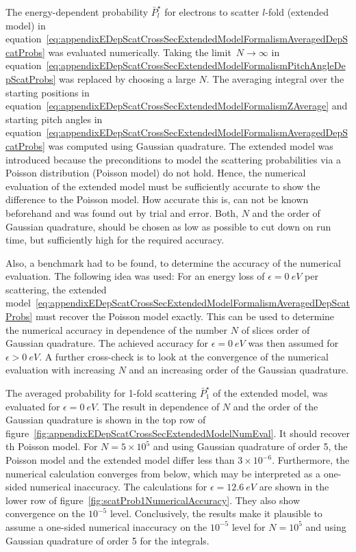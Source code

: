 The energy-dependent probability $\bar{P}^{\star}_l$ for electrons to scatter $l$-fold (extended model) in equation~\eqref{eq:appendixEDepScatCrossSecExtendedModelFormalismAveragedDepScatProbs} was evaluated numerically. Taking the limit~$N\rightarrow\infty$ in equation~\eqref{eq:appendixEDepScatCrossSecExtendedModelFormalismPitchAngleDepScatProbs} was replaced by choosing a large $N$. The averaging integral over the starting positions in equation~\eqref{eq:appendixEDepScatCrossSecExtendedModelFormalismZAverage} and starting pitch angles in equation~\eqref{eq:appendixEDepScatCrossSecExtendedModelFormalismAveragedDepScatProbs} was computed using Gaussian quadrature. The extended model was introduced because the preconditions to model the scattering probabilities via a Poisson distribution (Poisson model) do not hold. Hence, the numerical evaluation of the extended model must be sufficiently accurate to show the difference to the Poisson model. How accurate this is, can not be known beforehand and was found out by trial and error. Both, $N$ and the order of Gaussian quadrature, should be chosen as low as possible to cut down on run time, but sufficiently high for the required accuracy. 

Also, a benchmark had to be found, to determine the accuracy of the numerical evaluation. The following idea was used: For an energy loss of $\epsilon=\SI{0}{eV}$ per scattering, the extended model~\eqref{eq:appendixEDepScatCrossSecExtendedModelFormalismAveragedDepScatProbs} must recover the Poisson model exactly. This can be used to determine the numerical accuracy in dependence of the number $N$ of slices order of Gaussian quadrature. The achieved accuracy for $\epsilon=\SI{0}{eV}$ was then assumed for $\epsilon>\SI{0}{eV}$. A further cross-check is to look at the convergence of the numerical evaluation with increasing $N$ and an increasing order of the Gaussian quadrature.

The averaged probability for 1-fold scattering $\bar{P}^{\star}_1$ of the extended model, was evaluated for $\epsilon=\SI{0}{eV}$. The result in dependence of $N$ and the order of the Gaussian quadrature is shown in the top row of figure~\ref{fig:appendixEDepScatCrossSecExtendedModelNumEval}. It should recover th Poisson model. For $N=5\times10^5$ and using Gaussian quadrature of order 5, the Poisson model and the extended model differ less than $3\times10^{-6}$. Furthermore, the numerical calculation converges from below, which may be interpreted as a one-sided numerical inaccuracy. The calculations for $\epsilon=\SI{12.6}{eV}$ are shown in the lower row of figure~\ref{fig:scatProb1NumericalAccuracy}. They also show convergence on the $10^{-5}$ level. Conclusively, the results make it plausible to assume a one-sided numerical inaccuracy on the $10^{-5}$ level for $N=10^5$ and using Gaussian quadrature of order 5 for the integrals.

